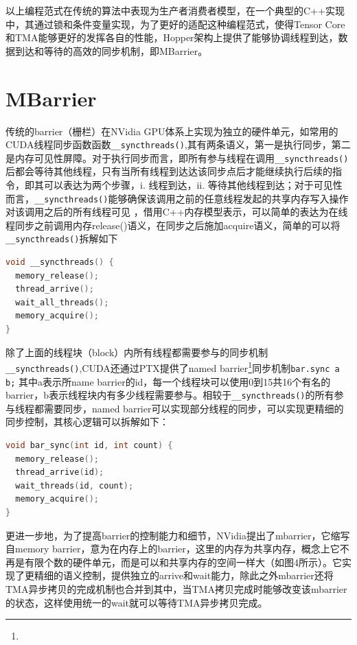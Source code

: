 以上编程范式在传统的算法中表现为生产者消费者模型，在一个典型的C++实现中，其通过锁和条件变量实现，为了更好的适配这种编程范式，使得Tensor Core和TMA能够更好的发挥各自的性能，Hopper架构上提供了能够协调线程到达，数据到达和等待的高效的同步机制，即MBarrier。

\section{MBarrier}

传统的barrier（栅栏）在NVidia GPU体系上实现为独立的硬件单元，如常用的CUDA线程同步函数函数\lstinline|__syncthreads()|,其有两条语义，第一是执行同步，第二是内存可见性屏障。对于执行同步而言，即所有参与线程在调用\lstinline|__syncthreads()|后都会等待其他线程，只有当所有线程到达达该同步点后才能继续执行后续的指令，即其可以表达为两个步骤，i. 线程到达，ii. 等待其他线程到达；对于可见性而言，\lstinline|__syncthreads()|能够确保该调用之前的任意线程发起的共享内存写入操作对该调用之后的所有线程可见 ，借用C++内存模型表示，可以简单的表达为在线程同步之前调用内存release()语义，在同步之后施加acquire语义，简单的可以将\lstinline|__syncthreads()|拆解如下

\begin{lstlisting}[language=C++]
void __syncthreads() {
  memory_release();
  thread_arrive();
  wait_all_threads();
  memory_acquire();
}
\end{lstlisting}

除了上面的线程块（block）内所有线程都需要参与的同步机制\lstinline|__syncthreads()|,CUDA还通过PTX提供了named barrier\footnote{\reedVIIIurlA}同步机制\lstinline|bar.sync a b;| 其中a表示所name barrier的id，每一个线程块可以使用0到15共16个有名的barrier，b表示线程块内有多少线程需要参与。相较于\lstinline|__syncthreads()|的所有参与线程都需要同步，named barrier可以实现部分线程的同步，可以实现更精细的同步控制，其核心逻辑可以拆解如下：

\begin{lstlisting}[language=C++]
void bar_sync(int id, int count) {
  memory_release();
  thread_arrive(id);
  wait_threads(id, count);
  memory_acquire();
}
\end{lstlisting}

更进一步地，为了提高barrier的控制能力和细节，NVidia提出了mbarrier，它缩写自memory barrier，意为在内存上的barrier，这里的内存为共享内存，概念上它不再是有限个数的硬件单元，而是可以和共享内存的空间一样大（如图4所示）。它实现了更精细的语义控制，提供独立的arrive和wait能力，除此之外mbarrier还将TMA异步拷贝的完成机制也合并到其中，当TMA拷贝完成时能够改变该mbarrier的状态，这样使用统一的wait就可以等待TMA异步拷贝完成。

